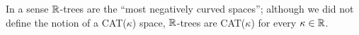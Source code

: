 In a sense $\R$-trees are the ``most negatively curved spaces''; although we did not define the notion of a CAT($\kappa$) space, $\R$-trees are CAT($\kappa$) for every $\kappa\in\R$.
%
%
